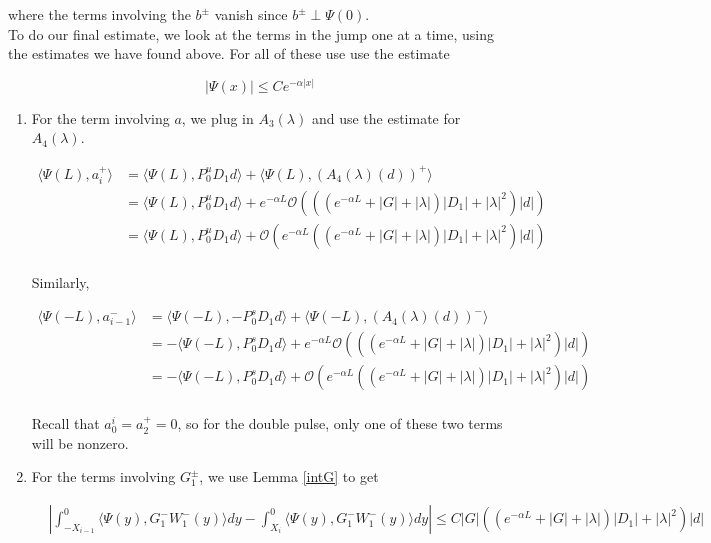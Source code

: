 \documentclass[12pt]{article}
\begin{document}
where the terms involving the $b^\pm$ vanish since $b^\pm \perp \Psi(0)$.\\

To do our final estimate, we look at the terms in the jump one at a time, using the estimates we have found above. For all of these use use the estimate

\[
|\Psi(x)| \leq C e^{-\alpha|x|}
\]

\begin{enumerate}

\item For the term involving $a$, we plug in $A_3(\lambda)$ and use the estimate for $A_4(\lambda)$.

\begin{align*}
\langle \Psi(L), a_i^+ \rangle &= \langle \Psi(L), P_0^u D_1 d \rangle + \langle \Psi(L), (A_4(\lambda)(d))^+\rangle\\
&= \langle \Psi(L), P_0^u D_1 d \rangle + e^{-\alpha L} \mathcal{O} \left(((e^{-\alpha L} + |G| + |\lambda|)|D_1| + |\lambda|^2)|d|\right)\\
&= \langle \Psi(L), P_0^u D_1 d \rangle + \mathcal{O} \left( e^{-\alpha L} \left((e^{-\alpha L} + |G| + |\lambda|)|D_1| + |\lambda|^2 \right)|d|\right)\\
\end{align*}

Similarly,

\begin{align*}
\langle \Psi(-L), a_{i-1}^- \rangle &= \langle \Psi(-L), -P_0^s D_1 d \rangle + \langle \Psi(-L), (A_4(\lambda)(d))^-\rangle\\
&= -\langle \Psi(-L), P_0^s D_1 d \rangle + e^{-\alpha L} \mathcal{O} \left(((e^{-\alpha L} + |G| + |\lambda|)|D_1| + |\lambda|^2)|d|\right)\\
&= -\langle \Psi(-L), P_0^s D_1 d \rangle + \mathcal{O} \left( e^{-\alpha L} \left((e^{-\alpha L} + |G| + |\lambda|)|D_1| + |\lambda|^2 \right)|d|\right)\\
\end{align*}

Recall that $a_0^i = a_2^+ = 0$, so for the double pulse, only one of these two terms will be nonzero.

\item For the terms involving $G_1^\pm$, we use Lemma \ref{intG} to get 

\begin{align*}
&\left| \int_{-X_{i-1}}^0 \langle \Psi(y), G_1^- W_1^-(y) \rangle dy - \int_{X_i}^0 \langle \Psi(y), G_1^- W_1^-(y) \rangle dy\right| \leq C|G| \left( \left(e^{-\alpha L} + |G| + |\lambda|  \right) |D_1| + |\lambda|^2 \right)|d|
\end{align*}


\end{enumerate}
\end{document}
